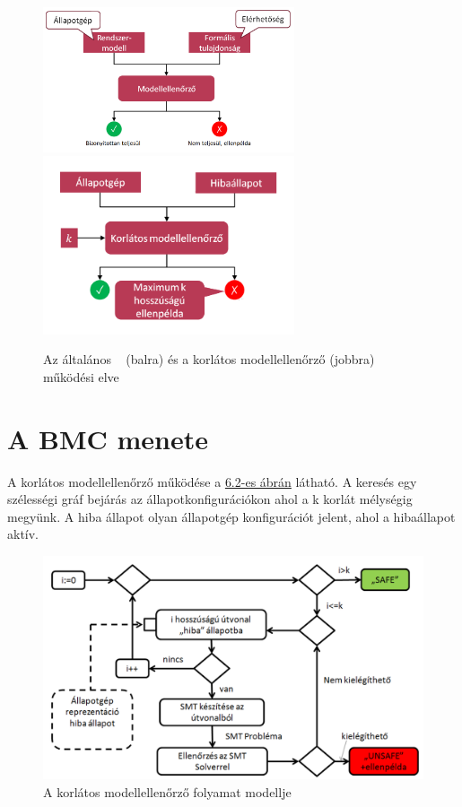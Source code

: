 \begin{figure}[!ht]
	\centering
	\includegraphics[width=74mm, keepaspectratio]{figures/altmc.png}\hspace{0cm}
	\includegraphics[width=74mm, keepaspectratio]{figures/bmc.png}
	\caption{Az általános ~ (balra) és a korlátos modellellenőrző (jobbra) működési elve}
	\label{fig:mcheck}
\end{figure}


\section{A BMC menete}
A korlátos modellellenőrző működése a \hyperref[fig:bmcfolyamat]{6.2-es ábrán} látható. A keresés egy szélességi gráf
bejárás az állapotkonfigurációkon ahol a k korlát mélységig megyünk. A hiba állapot olyan állapotgép konfigurációt jelent, ahol a hibaállapot aktív.

\begin{figure}[!ht]
	\centering
	\includegraphics[width=150mm, keepaspectratio]{figures/bmcfolyamatmodell.png}
	\caption{A korlátos modellellenőrző folyamat modellje}
	\label{fig:bmcfolyamat}
\end{figure}

